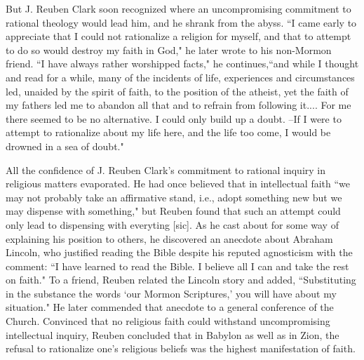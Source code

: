 \documentclass{article}
\begin{document}
But J. Reuben Clark soon recognized where an uncompromising commitment to 
rational theology would lead him, and he shrank from the abyss. 
``I came early to appreciate that I could not rationalize a religion for myself, 
and that to attempt to do so would destroy my faith in God," 
he later wrote to his non-Mormon friend. ``I have always rather worshipped 
facts," he continues,``and while I thought and read for a while, many of the 
incidents of life, experiences and circumstances led, unaided by the spirit of 
faith, to the position of the atheist, yet the faith of my fathers led me to 
abandon all that and to refrain from following it.... For me there seemed to be 
no alternative. I could only build up a doubt. --If I were to attempt to 
rationalize about my life here, and the life too come, I would be drowned in 
a sea of doubt."

All the confidence of J. Reuben Clark's commitment to rational inquiry in 
religious matters evaporated. He had once believed that in intellectual faith 
``we may not probably take an affirmative stand, i.e., adopt something new but 
we may dispense with something," but Reuben found that such an attempt could 
only lead to dispensing with everyting [sic]. As he cast about for some way of 
explaining his position to others, he discovered an anecdote about Abraham 
Lincoln, who justified reading the Bible despite his reputed agnosticism with 
the comment: ``I have learned to read the Bible. I believe all I can and take 
the rest on faith." To a friend, Reuben related the Lincoln story and added, 
``Substituting in the substance the words `our Mormon Scriptures,' you will 
have about my situation." He later commended that anecdote to a general 
conference of the Church. Convinced that no religious faith could withstand 
uncompromising intellectual inquiry, Reuben concluded that in Babylon as well 
as in Zion, the refusal to rationalize one's religious beliefs was the highest 
manifestation of faith.

\cite{clark}

\newpage

\printbibliography
\thispagestyle{empty}
\end{document}
